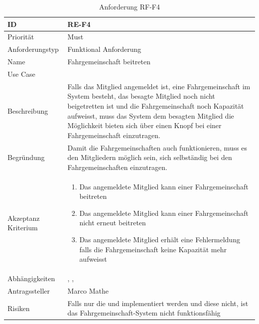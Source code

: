 \begin{table}[ht]
\centering
  \begin{tabular}{ l | p{8cm} }
	\hline
	\rowcolor{gray}
	ID 			&	\textbf{RE-F4}\\ \hline
	Priorität 		&	Must\\ \hline
	Anforderungstyp	&	Funktional Anforderung\\ \hline
	Name 			&	Fahrgemeinschaft beitreten\\ \hline
	Use Case 		&	\nameref{table:use_case_3}\\ \hline
	Beschreibung 	&	Falls das Mitglied angemeldet ist, eine Fahrgemeinschaft im System besteht, das besagte Mitglied noch nicht beigetretten ist und die Fahrgemeinschaft noch Kapazität aufweisst, muss das System dem besagten Mitglied die Möglichkeit bieten sich über einen Knopf bei einer Fahrgemeinschaft einzutragen.\\ \hline
	Begründung 		&	Damit die Fahrgemeinschaften auch funktionieren, muss es den Mitgliedern möglich sein, sich selbständig bei den Fahrgemeinschaften einzutragen.\\ \hline
	Akzeptanz Kriterium	&	\begin{enumerate}
					\item Das angemeldete Mitglied kann einer Fahrgemeinschaft beitreten
					\item Das angemeldete Mitglied kann einer Fahrgemeinschaft nicht erneut beitreten
					\item Das angemeldete Mitglied erhält eine Fehlermeldung falls die Fahrgemeinschaft keine Kapazität mehr aufweisst
					\end{enumerate}
					\\ \hline
	Abhängigkeiten 	&	\nameref{table:req_1}, \nameref{table:req_2}, \nameref{table:req_3}\\ \hline
	Antragssteller 	&	Marco Mathe\\ \hline
	Risiken	 	&	Falls nur die \nameref{table:req_2} und \nameref{table:req_3} implementiert werden und diese nicht, ist das Fahrgemeinschaft-System nicht funktionsfähig
  \end{tabular}
   \caption{Anforderung RF-F4}\label{table:req_4}
\end{table}

